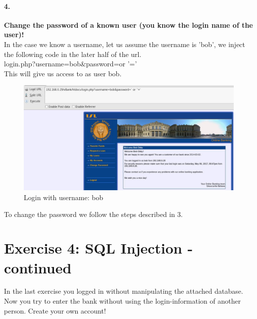 \documentclass[12pt]{report}
\begin{document}
	\paragraph*{4.} {\bf Change the password of a known user (you know the login name of the user)!}\\
	In the case we know a username, let us assume the username is 'bob', we inject the following code in the later half of the url.\\
	{\sf login.php?username=bob\&password=\textasciiacute or \textasciiacute'='}\\
	This will give us access to as user bob.
	\begin{figure}[H]
		\includegraphics[width=0.75\textheight,height=0.3\textheight]{images/loginwithusername.jpg}
		\caption{Login with username: bob}
	\end{figure}
	To change the password we follow the steps described in 3.
	
	\newpage
	
	\section*{Exercise 4: SQL Injection - continued}
	In the last exercise you logged in without manipulating the attached database. Now you try to enter the bank without using the login-information of another person. Create your own account!
\end{document}
